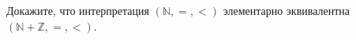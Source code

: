 Докажите, что интерпретация $(\mathbb{N}, =, <)$ элементарно эквивалентна $(\mathbb{N} + \mathbb{Z}, =, <)$.
